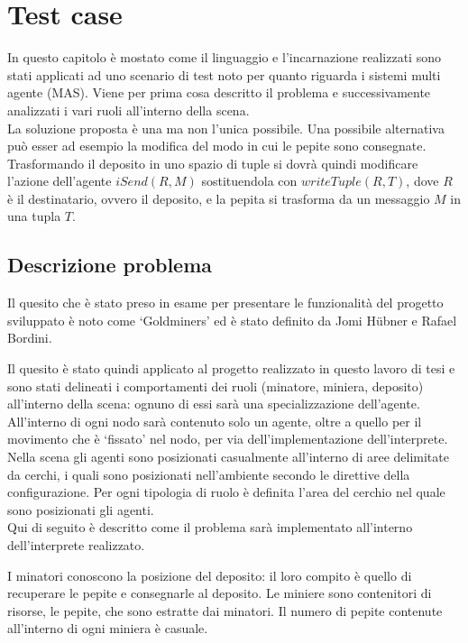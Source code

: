\chapter{Test case}\label{chap:validation}
In questo capitolo è mostato come il linguaggio e l'incarnazione realizzati sono stati applicati ad uno scenario di test noto per quanto riguarda i sistemi multi agente (MAS).
Viene per prima cosa descritto il problema e successivamente analizzati i vari ruoli all'interno della scena.
\\
La soluzione proposta è una ma non l'unica possibile. Una possibile alternativa può esser ad esempio la modifica del modo in cui le pepite sono consegnate. Trasformando il deposito in uno spazio di tuple si dovrà quindi modificare l'azione dell'agente $iSend(R,M)$ sostituendola con $writeTuple(R,T)$, dove $R$ è il destinatario, ovvero il deposito, e la pepita si trasforma da un messaggio $M$ in una tupla $T$.

\section{Descrizione problema}
Il quesito che è stato preso in esame per presentare le funzionalità del progetto sviluppato è noto come `Goldminers' ed è stato definito da Jomi H\"ubner e Rafael Bordini.

\medskip
{}
\medskip

Il quesito è stato quindi applicato al progetto realizzato in questo lavoro di tesi e sono stati delineati i comportamenti dei ruoli (minatore, miniera, deposito) all'interno della scena: ognuno di essi sarà una specializzazione dell'agente. All'interno di ogni nodo sarà contenuto solo un agente, oltre a quello per il movimento che è `fissato' nel nodo, per via dell'implementazione dell'interprete.
\\
Nella scena gli agenti sono posizionati casualmente all'interno di aree delimitate da cerchi, i quali sono posizionati nell'ambiente secondo le direttive della configurazione. Per ogni tipologia di ruolo è definita l'area del cerchio nel quale sono posizionati gli agenti.
\\
Qui di seguito è descritto come il problema sarà implementato all'interno dell'interprete realizzato.

I minatori conoscono la posizione del deposito: il loro compito è quello di recuperare le pepite e consegnarle al deposito.
Le miniere sono contenitori di risorse, le pepite, che sono estratte dai minatori. Il numero di pepite contenute all'interno di ogni miniera è casuale.

